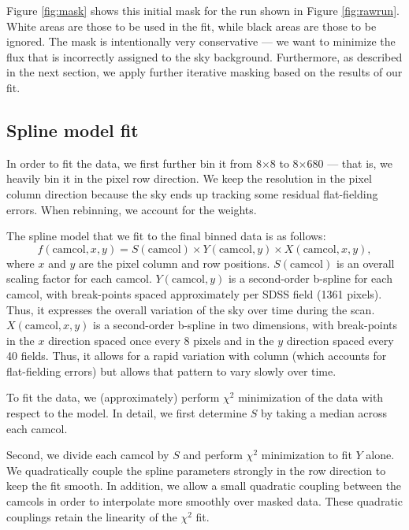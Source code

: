 \documentclass[10pt,preprint]{aastex}
\begin{document}
Figure \ref{fig:mask} shows this initial mask for the run shown in
Figure \ref{fig:rawrun}. White areas are those to be used in the fit,
while black areas are those to be ignored. The mask is intentionally
very conservative --- we want to minimize the flux that is incorrectly
assigned to the sky background. Furthermore, as described in the next
section, we apply further iterative masking based on the results of
our fit.

\subsection{Spline model fit}
\label{sec:spline}

In order to fit the data, we first further bin it from 8$\times$8 to
8$\times$680 --- that is, we heavily bin it in the pixel row
direction.  We keep the resolution in the pixel column direction
because the sky ends up tracking some residual flat-fielding
errors. When rebinning, we account for the weights. 

The spline model that we fit to the final binned data is as follows:
\begin{equation}
\label{skyspline}
	f(\mathrm{camcol}, x, y) = S(\mathrm{camcol}) \times
	Y(\mathrm{camcol}, y) \times X(\mathrm{camcol}, x, y),
\end{equation}
where $x$ and $y$ are the pixel column and row positions.
$S(\mathrm{camcol})$ is an overall scaling factor for each
camcol. $Y(\mathrm{camcol}, y)$ is a second-order b-spline for each
camcol, with break-points spaced approximately per SDSS field (1361
pixels). Thus, it expresses the overall variation of the sky over time
during the scan.  $X(\mathrm{camcol}, x, y)$ is a second-order
b-spline in two dimensions, with break-points in the $x$ direction
spaced once every 8 pixels and in the $y$ direction spaced every 40
fields. Thus, it allows for a rapid variation with column (which
accounts for flat-fielding errors) but allows that pattern to vary
slowly over time.

To fit the data, we (approximately) perform $\chi^2$ minimization of
the data with respect to the model. In detail, we first determine $S$
by taking a median across each camcol. 

Second, we divide each camcol by $S$ and perform $\chi^2$ minimization
to fit $Y$ alone. We quadratically couple the spline parameters
strongly in the row direction to keep the fit smooth. In addition, we
allow a small quadratic coupling between the camcols in order to
interpolate more smoothly over masked data. These quadratic couplings
retain the linearity of the $\chi^2$ fit.
\end{document}
